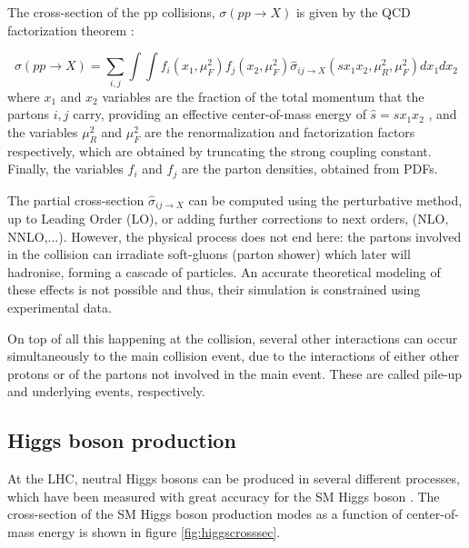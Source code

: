 The cross-section of the pp collisions, $\sigma(pp\rightarrow X)$ is given by the QCD factorization theorem \cite{Butterworth:2012fj}:

\begin{equation}
    \sigma(pp\rightarrow X) = \sum_{i,j} \int \int f_i (x_1 , \mu_F^2 )f_j (x_2 , \mu_F^2 ) \hat{\sigma}_{ij \rightarrow X} (s x_1 x_2 , \mu_R^2 , \mu_F^2 ) dx_1 dx_2 
\end{equation}
where $x_1$ and $x_2$ variables are the fraction of the total momentum that the partons $i,j$ carry, providing an effective center-of-mass energy of $\hat{s} = sx_1 x_2$ , and the variables $\mu_R^2$ and $\mu_F^2$ are the renormalization and factorization factors respectively, which are obtained by truncating the strong coupling constant. Finally, the variables $f_i$ and $f_j$ are the parton densities, obtained from PDFs.

The partial cross-section $\hat{\sigma}_{ij \rightarrow X}$ can be computed using the perturbative method, up to Leading Order (LO), or adding further corrections to next orders, (NLO, NNLO,...). However, the physical process does not end here: the partons involved in the collision can irradiate soft-gluons (parton shower) which later will hadronise, forming a cascade of particles. An accurate theoretical modeling of these effects is not possible and thus, their simulation is constrained using experimental data.

On top of all this happening at the collision, several other interactions can occur simultaneously to the main collision event, due to the interactions of either other protons or of the partons not involved in the main event. These are called pile-up and underlying events, respectively.

\subsection{Higgs boson production}

At the LHC, neutral Higgs bosons can be produced in several different processes, which have been measured with great accuracy for the SM Higgs boson \cite{Dittmaier:1318996}. The cross-section of the SM Higgs boson production modes as a function of center-of-mass energy is shown in figure \ref{fig:higgscrosssec}.

